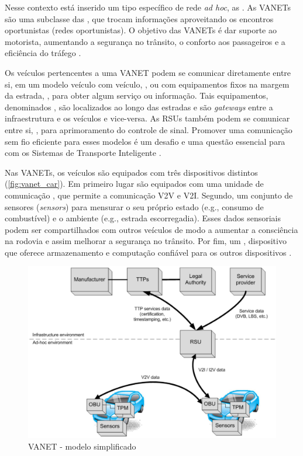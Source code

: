 \documentclass[mestrado, pre-defesa, english, brazil]{packages/icmc}
\begin{document}
Nesse contexto está inserido um tipo específico de rede \textit{ad hoc}, as . As VANETs são uma subclasse das , que trocam informações aproveitando os encontros oportunistas (redes oportunistas). O objetivo das VANETs é dar suporte ao motorista, aumentando a segurança no trânsito, o conforto aos passageiros e a eficiência do tráfego \cite{Fuentes-2011}.

Os veículos pertencentes a uma VANET podem se comunicar diretamente entre si, em um modelo veículo com veículo, , ou com equipamentos fixos na margem da estrada, , para obter algum serviço ou informação. Tais equipamentos, denominados , são localizados ao longo das estradas e são \textit{gateways} entre a infraestrutura e os veículos e vice-versa. As RSUs também podem se comunicar entre si, , para aprimoramento do controle de sinal. Promover uma comunicação sem fio eficiente para esses modelos é um desafio e uma questão essencial para com os Sistemas de Transporte Inteligente \cite{Faezipour-2012,tangade-2013, Kishimoto-2014}.

Nas VANETs, os veículos são equipados com três dispositivos distintos (\autoref{fig:vanet_car}). Em primeiro lugar são equipados com uma unidade de comunicação , que permite a comunicação V2V e V2I. Segundo, um conjunto de sensores (\textit{sensors}) para mensurar o seu próprio estado (e.g., consumo de combustível) e o ambiente (e.g., estrada escorregadia). Esses dados sensoriais podem ser compartilhados com outros veículos de modo a aumentar a consciência na rodovia e assim melhorar a segurança no trânsito. Por fim, um , dispositivo que oferece armazenamento e computação confiável para os outros dispositivos \cite{Fuentes-2011}.

\begin{figure}[!htbp]
	\centering
	\caption{\label{fig:vanet_car}VANET - modelo simplificado}
	\includegraphics[width=14cm]{img/vanet-car.jpeg}
\end{figure}
\end{document}
